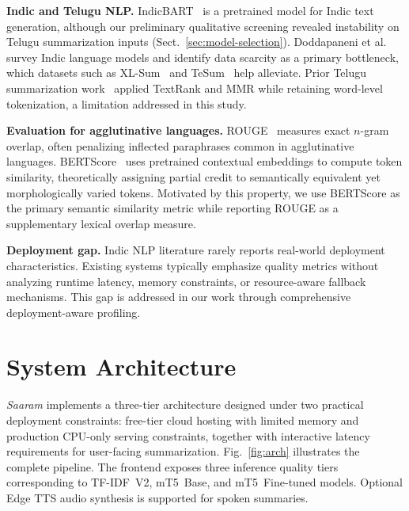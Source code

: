 \documentclass[runningheads]{llncs}
\begin{document}
\textbf{Indic and Telugu NLP.}
IndicBART~\cite{kumar2022indicbart} is a pretrained model for Indic text generation, although our preliminary qualitative screening revealed instability on Telugu summarization inputs (Sect.~\ref{sec:model-selection}). Doddapaneni et al.~\cite{doddapaneni2021primer} survey Indic language models and identify data scarcity as a primary bottleneck, which datasets such as XL-Sum~\cite{hasan2021xlsum} and TeSum~\cite{urlana2022tesum} help alleviate. Prior Telugu summarization work~\cite{anandbabu2023extractive} applied TextRank and MMR while retaining word-level tokenization, a limitation addressed in this study.


\textbf{Evaluation for agglutinative languages.}
ROUGE~\cite{lin2004rouge} measures exact $n$-gram overlap, often penalizing inflected paraphrases common in agglutinative languages. BERTScore~\cite{zhang2020bertscore} uses pretrained contextual embeddings to compute token similarity, theoretically assigning partial credit to semantically equivalent yet morphologically varied tokens. Motivated by this property, we use BERTScore as the primary semantic similarity metric while reporting ROUGE as a supplementary lexical overlap measure.


\textbf{Deployment gap.}
Indic NLP literature rarely reports real-world deployment characteristics. Existing systems typically emphasize quality metrics without analyzing runtime latency, memory constraints, or resource-aware fallback mechanisms. This gap is addressed in our work through comprehensive deployment-aware profiling.


\section{System Architecture}
\label{sec:arch}

\textit{Saaram} implements a three-tier architecture designed under two practical deployment constraints: free-tier cloud hosting with limited memory and production CPU-only serving constraints, together with interactive latency requirements for user-facing summarization. Fig.~\ref{fig:arch} illustrates the complete pipeline. The frontend exposes three inference quality tiers corresponding to TF-IDF~V2, mT5~Base, and mT5~Fine-tuned models. Optional Edge TTS audio synthesis is supported for spoken summaries.
\end{document}
